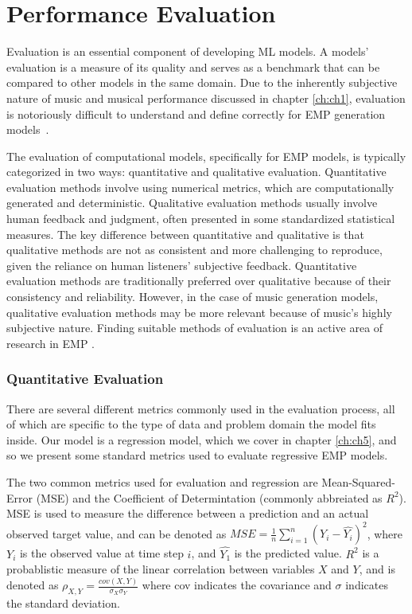 \section{Performance Evaluation}\label{sec:evaluation}
Evaluation is an essential component of developing ML models. A models' evaluation is a measure of its quality and serves as a benchmark that can be compared to other models in the same domain. Due to the inherently subjective nature of music and musical performance discussed in chapter \ref{ch:ch1}, evaluation is notoriously difficult to understand and define correctly for EMP generation models~\cite{cancino2018computational}. 

The evaluation of computational models, specifically for EMP models, is typically categorized in two ways: quantitative and qualitative evaluation. Quantitative evaluation methods involve using numerical metrics, which are computationally generated and deterministic. Qualitative evaluation methods usually involve human feedback and judgment, often presented in some standardized statistical measures. The key difference between quantitative and qualitative is that qualitative methods are not as consistent and more challenging to reproduce, given the reliance on human listeners' subjective feedback. Quantitative evaluation methods are traditionally preferred over qualitative because of their consistency and reliability. However, in the case of music generation models, qualitative evaluation methods may be more relevant because of music's highly subjective nature. Finding suitable methods of evaluation is an active area of research in EMP \cite{cancino2018computational}. 

\subsubsection{Quantitative Evaluation}
There are several different metrics commonly used in the evaluation process, all of which are specific to the type of data and problem domain the model fits inside. Our model is a regression model, which we cover in chapter \ref{ch:ch5}, and so we present some standard metrics used to evaluate regressive EMP models. 

The two common metrics used for evaluation and regression are Mean-Squared-Error (MSE) and the Coefficient of Determintation (commonly abbreiated as $R^2$). MSE is used to measure the difference between a prediction and an actual observed target value, and can be denoted as $MSE = \frac{1}{n}\sum_{i=1}^{n}(Y_i - \hat{Y_i})^2$, where $Y_i$ is the observed value at time step $i$, and $\hat{Y_1}$ is the predicted value. $R^2$ is a probablistic measure of the linear correlation between variables $X$ and $Y$, and is denoted as $\rho_{X,Y} = \frac{cov(X,Y)}{\sigma_{X}\sigma_{Y}}$ where cov indicates the covariance and $\sigma$ indicates the standard deviation.

